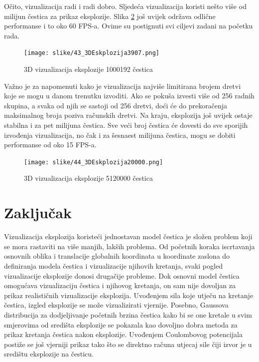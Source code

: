 \documentclass{foi}
\begin{document}
Očito, vizualizacija radi i radi dobro. Sljedeća vizualizacija koristi nešto više od milijun čestica za prikaz eksplozije. Slika \ref{fig:3D_2000} još uvijek održava odlične performanse i to oko 60 FPS-a. Ovime su postignuti svi ciljevi zadani na početku rada.
\\
\begin{figure}[H]
	\centering
	\texttt{[image: slike/43\_3DEskplozija3907.png]}
	\captionsetup{justification=centering}
	\caption{3D vizualizacija eksplozije 1000192 čestica}
	\label{fig:3D_3907}
\end{figure}

Važno je za napomenuti kako je vizualizacija najviše limitirana brojem dretvi koje se mogu u danom trenutku izvoditi. Ako se pokuša izvesti više od 256 radnih skupina, a svaka od njih se sastoji od 256 dretvi, doći će do prekoračenja maksimalnog broja poziva računskih dretvi. Na kraju, eksplozija još uvijek ostaje stabilna i za pet milijuna čestica. Sve veći broj čestica će dovesti do sve sporijih izvođenja vizualizacija, no čak i za šesnaest milijuna čestica, mogu se dobiti performanse od oko 15 FPS-a. 
\\
\begin{figure}[H]
	\centering
	\texttt{[image: slike/44\_3DEskplozija20000.png]}
	\captionsetup{justification=centering}
	\caption{3D vizualizacija eksplozije 5120000 čestica}
	\label{fig:3D_2000}
\end{figure}

 
\chapter{Zaključak}
Vizualizacija eksplozija koristeći jednostavan model čestica je složen problem koji se mora rastaviti na više manjih, lakših problema. Od početnih koraka iscrtavanja osnovnih oblika i translacije globalnih koordinata u koordinate zaslona do definiranja modela čestica i vizualizacije njihovih kretanja, svaki pogled vizualizacije eksplozije donosi drugačije probleme. Dok osnovni model čestica omogućava vizualizaciju čestica i njihovog kretanja, on sam nije dovoljan za prikaz realističnih vizualizacije eksplozija. Uvođenjem sila koje utječu na kretanje čestica, izgled eksplozije se može vizualizirati vjernije. Posebno, Gaussova distribucija za dodjeljivanje početnih brzina čestica kako bi se one kretale u svim smjerovima od središta eksplozije se pokazala kao dovoljno dobra metoda za prikaz kretanja čestica nakon eksplozije. Uvođenjem Coulombovog potencijala postiže se još vjerniji prikaz tako što se direktno računa utjecaj sile čiji izvor je u središtu eksplozije na česticu. 
\end{document}
